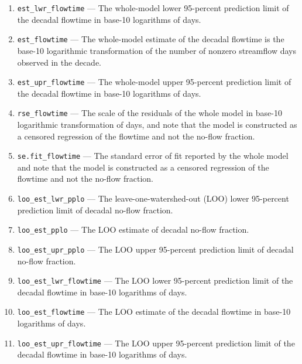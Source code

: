 \documentclass[1p, authoryear, 11pt, times, preprint]{elsarticle}
\newcommand{\code}[1]{{\color{black}%
                       \mbox{\lstinline[basicstyle={\small\ttfamily},
                                        keywordstyle=\scriptsize\ttfamily]|#1|}}}
\begin{document}
\begin{enumerate}
\item \code{est_lwr_flowtime} --- The whole-model lower 95-percent prediction limit of the decadal flowtime in base-10 logarithms of days.
\item \code{est_flowtime} --- The whole-model estimate of the decadal flowtime is the base-10 logarithmic transformation of the number of nonzero streamflow days observed in the decade.
\item \code{est_upr_flowtime} --- The whole-model upper 95-percent prediction limit of the decadal flowtime in base-10 logarithms of days.
\item \code{rse_flowtime} --- The scale of the residuals of the whole model in base-10 logarithmic transformation of days, and note that the model is constructed as a censored regression of the flowtime and not the no-flow fraction.
\item \code{se.fit_flowtime} --- The standard error of fit reported by the whole model and note that the model is constructed as a censored regression of the flowtime and not the no-flow fraction.
\item \code{loo_est_lwr_pplo} --- The leave-one-watershed-out (LOO) lower 95-percent prediction limit of decadal no-flow fraction.
\item \code{loo_est_pplo} --- The LOO estimate of decadal no-flow fraction.
\item \code{loo_est_upr_pplo} --- The LOO upper 95-percent prediction limit of decadal no-flow fraction.
\item \code{loo_est_lwr_flowtime} --- The LOO lower 95-percent prediction limit of the decadal flowtime in base-10 logarithms of days.
\item \code{loo_est_flowtime} --- The LOO estimate of the decadal flowtime in base-10 logarithms of days.
\item \code{loo_est_upr_flowtime} --- The LOO upper 95-percent prediction limit of the decadal flowtime in base-10 logarithms of days.
\end{enumerate}


\end{document}
